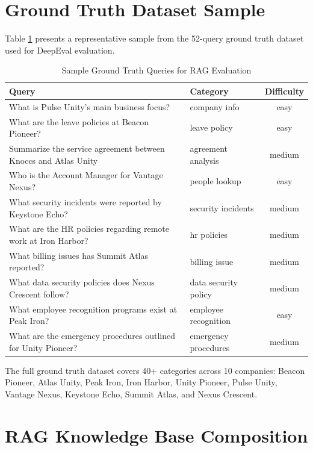 
\section{Ground Truth Dataset Sample}

Table \ref{tab:ground_truth_sample} presents a representative sample from the 52-query ground truth dataset used for DeepEval evaluation.

\begin{table}[H]
\centering
\caption{Sample Ground Truth Queries for RAG Evaluation}
\label{tab:ground_truth_sample}
\begin{tabular}{|p{7cm}|p{2.5cm}|c|}
\hline
\textbf{Query} & \textbf{Category} & \textbf{Difficulty} \\ \hline
What is Pulse Unity's main business focus? & company info & easy \\ \hline
What are the leave policies at Beacon Pioneer? & leave policy & easy \\ \hline
Summarize the service agreement between Knoccs and Atlas Unity & agreement analysis & medium \\ \hline
Who is the Account Manager for Vantage Nexus? & people lookup & easy \\ \hline
What security incidents were reported by Keystone Echo? & security incidents & medium \\ \hline
What are the HR policies regarding remote work at Iron Harbor? & hr policies & medium \\ \hline
What billing issues has Summit Atlas reported? & billing issue & medium \\ \hline
What data security policies does Nexus Crescent follow? & data security policy & medium \\ \hline
What employee recognition programs exist at Peak Iron? & employee recognition & easy \\ \hline
What are the emergency procedures outlined for Unity Pioneer? & emergency procedures & medium \\ \hline
\end{tabular}
\end{table}

The full ground truth dataset covers 40+ categories across 10 companies: Beacon Pioneer, Atlas Unity, Peak Iron, Iron Harbor, Unity Pioneer, Pulse Unity, Vantage Nexus, Keystone Echo, Summit Atlas, and Nexus Crescent.

\section{RAG Knowledge Base Composition}

